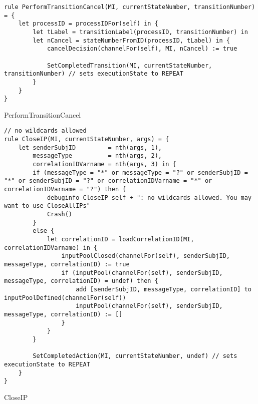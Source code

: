 \begin{listing}[H]
\begin{verbatim}
rule PerformTransitionCancel(MI, currentStateNumber, transitionNumber) = {
    let processID = processIDFor(self) in {
        let tLabel = transitionLabel(processID, transitionNumber) in
        let nCancel = stateNumberFromID(processID, tLabel) in {
            cancelDecision(channelFor(self), MI, nCancel) := true

            SetCompletedTransition(MI, currentStateNumber, transitionNumber) // sets executionState to REPEAT
        }
    }
}
\end{verbatim}
\caption{PerformTransitionCancel}
\label{lst:asm:PerformTransitionCancel}
\end{listing}






\begin{listing}[H]
\begin{verbatim}
// no wildcards allowed
rule CloseIP(MI, currentStateNumber, args) = {
    let senderSubjID         = nth(args, 1),
        messageType          = nth(args, 2),
        correlationIDVarname = nth(args, 3) in {
        if (messageType = "*" or messageType = "?" or senderSubjID = "*" or senderSubjID = "?" or correlationIDVarname = "*" or correlationIDVarname = "?") then {
            debuginfo CloseIP self + ": no wildcards allowed. You may want to use CloseAllIPs"
            Crash()
        }
        else {
            let correlationID = loadCorrelationID(MI, correlationIDVarname) in {
                inputPoolClosed(channelFor(self), senderSubjID, messageType, correlationID) := true
                if (inputPool(channelFor(self), senderSubjID, messageType, correlationID) = undef) then {
                    add [senderSubjID, messageType, correlationID] to inputPoolDefined(channelFor(self))
                    inputPool(channelFor(self), senderSubjID, messageType, correlationID) := []
                }
            }
        }

        SetCompletedAction(MI, currentStateNumber, undef) // sets executionState to REPEAT
    }
}
\end{verbatim}
\caption{CloseIP}
\label{lst:asm:CloseIP}
\end{listing}




